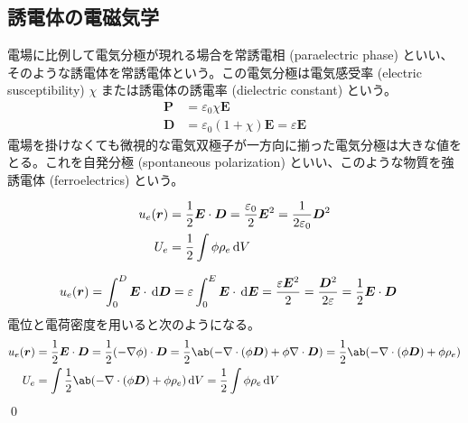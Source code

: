 \documentclass[uplatex,dvipdfmx,a4paper,11pt]{jlreq}
\makeatletter
\newcommand{\EE}{\bm{E}}
\newcommand{\DD}{\bm{D}}
\newcommand{\PP}{\bm{P}}
\newcommand{\rr}{\bm{r}}
\newcommand{\vnabla}{\mathbf{\nabla}}
\numberwithin{equation}{section}
\theoremstyle{definition}
\renewenvironment{proof}[1][\proofname]{\par
  \normalfont
  \topsep6\p@\@plus6\p@ \trivlist
  \item[\hskip\labelsep{\bfseries #1}\@addpunct{\bfseries}]\ignorespaces\quad\par
}{%
  \qed\endtrivlist\@endpefalse
}
\renewcommand\proofname{証明}
\makeatother
\begin{document}
\subsection{誘電体の電磁気学}
\begin{definition}[常誘電体]
  電場に比例して電気分極が現れる場合を常誘電相 (paraelectric phase) といい、そのような誘電体を常誘電体という。この電気分極は電気感受率 (electric susceptibility) $\chi$ または誘電体の誘電率 (dielectric constant) という。
  \begin{align}
    \PP & = \varepsilon_0\chi\EE                        \\
    \DD & = \varepsilon_0(1 + \chi)\EE = \varepsilon\EE
  \end{align}
  電場を掛けなくても微視的な電気双極子が一方向に揃った電気分極は大きな値をとる。これを自発分極 (spontaneous polarization) といい、このような物質を強誘電体 (ferroelectrics) という。
\end{definition}
\begin{theorem}[常誘電体のエネルギー密度]
  \begin{align}
    u_e(\rr) & = \frac{1}{2}\EE\cdot\DD = \frac{\varepsilon_0}{2}\EE^2 = \frac{1}{2\varepsilon_0}\DD^2 \\
    U_e      & = \frac{1}{2}\int\phi\rho_e\dl{V}
  \end{align}
\end{theorem}
\begin{proof}
  \begin{align}
    u_e(\rr) & = \int_0^D\EE\cdot\dl{\DD} = \varepsilon\int_0^E\EE\cdot\dl{\EE} = \frac{\varepsilon\EE^2}{2} = \frac{\DD^2}{2\varepsilon} = \frac{1}{2}\EE\cdot\DD
  \end{align}
  電位と電荷密度を用いると次のようになる。
  \begin{align}
    u_e(\rr) & = \frac{1}{2}\EE\cdot\DD = \frac{1}{2}(-\vnabla\phi)\cdot\DD = \frac{1}{2}\ab(-\vnabla\cdot(\phi\DD) + \phi\vnabla\cdot\DD) = \frac{1}{2}\ab(-\vnabla\cdot(\phi\DD) + \phi\rho_e) \\
    U_e      & = \int\frac{1}{2}\ab(-\vnabla\cdot(\phi\DD) + \phi\rho_e)\dl{V} = \frac{1}{2}\int\phi\rho_e\dl{V}
  \end{align}
\end{proof}
\end{document}
